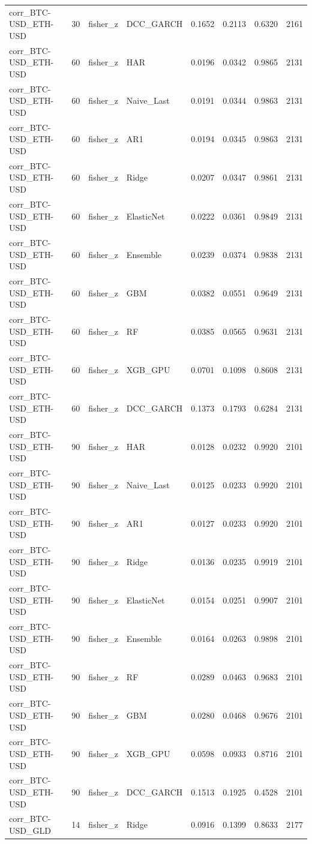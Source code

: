\begin{table}[H]
\begin{tabular}{llllrrrr}
corr_BTC-USD_ETH-USD & 30 & fisher_z & DCC_GARCH & 0.1652 & 0.2113 & 0.6320 & 2161 \\
corr_BTC-USD_ETH-USD & 60 & fisher_z & HAR & 0.0196 & 0.0342 & 0.9865 & 2131 \\
corr_BTC-USD_ETH-USD & 60 & fisher_z & Naive_Last & 0.0191 & 0.0344 & 0.9863 & 2131 \\
corr_BTC-USD_ETH-USD & 60 & fisher_z & AR1 & 0.0194 & 0.0345 & 0.9863 & 2131 \\
corr_BTC-USD_ETH-USD & 60 & fisher_z & Ridge & 0.0207 & 0.0347 & 0.9861 & 2131 \\
corr_BTC-USD_ETH-USD & 60 & fisher_z & ElasticNet & 0.0222 & 0.0361 & 0.9849 & 2131 \\
corr_BTC-USD_ETH-USD & 60 & fisher_z & Ensemble & 0.0239 & 0.0374 & 0.9838 & 2131 \\
corr_BTC-USD_ETH-USD & 60 & fisher_z & GBM & 0.0382 & 0.0551 & 0.9649 & 2131 \\
corr_BTC-USD_ETH-USD & 60 & fisher_z & RF & 0.0385 & 0.0565 & 0.9631 & 2131 \\
corr_BTC-USD_ETH-USD & 60 & fisher_z & XGB_GPU & 0.0701 & 0.1098 & 0.8608 & 2131 \\
corr_BTC-USD_ETH-USD & 60 & fisher_z & DCC_GARCH & 0.1373 & 0.1793 & 0.6284 & 2131 \\
corr_BTC-USD_ETH-USD & 90 & fisher_z & HAR & 0.0128 & 0.0232 & 0.9920 & 2101 \\
corr_BTC-USD_ETH-USD & 90 & fisher_z & Naive_Last & 0.0125 & 0.0233 & 0.9920 & 2101 \\
corr_BTC-USD_ETH-USD & 90 & fisher_z & AR1 & 0.0127 & 0.0233 & 0.9920 & 2101 \\
corr_BTC-USD_ETH-USD & 90 & fisher_z & Ridge & 0.0136 & 0.0235 & 0.9919 & 2101 \\
corr_BTC-USD_ETH-USD & 90 & fisher_z & ElasticNet & 0.0154 & 0.0251 & 0.9907 & 2101 \\
corr_BTC-USD_ETH-USD & 90 & fisher_z & Ensemble & 0.0164 & 0.0263 & 0.9898 & 2101 \\
corr_BTC-USD_ETH-USD & 90 & fisher_z & RF & 0.0289 & 0.0463 & 0.9683 & 2101 \\
corr_BTC-USD_ETH-USD & 90 & fisher_z & GBM & 0.0280 & 0.0468 & 0.9676 & 2101 \\
corr_BTC-USD_ETH-USD & 90 & fisher_z & XGB_GPU & 0.0598 & 0.0933 & 0.8716 & 2101 \\
corr_BTC-USD_ETH-USD & 90 & fisher_z & DCC_GARCH & 0.1513 & 0.1925 & 0.4528 & 2101 \\
corr_BTC-USD_GLD & 14 & fisher_z & Ridge & 0.0916 & 0.1399 & 0.8633 & 2177 \\

\end{tabular}
\end{table}

